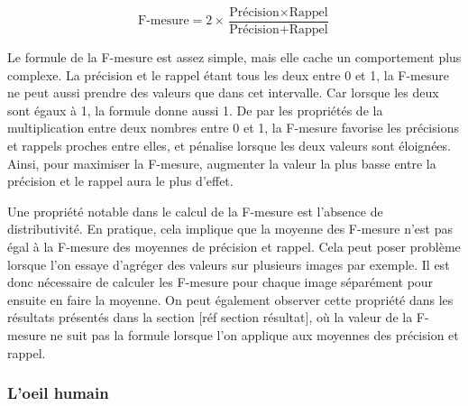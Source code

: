 	\begin{equation}
		\text{F-mesure} = 2 \times \frac{\text{Précision} \times \text{Rappel}}{\text{Précision}+\text{Rappel}}
	\end{equation}

	Le formule de la F-mesure est assez simple, mais elle cache un comportement plus complexe. La précision et le rappel étant tous les deux entre 0 et 1, la F-mesure ne peut aussi prendre des valeurs que dans cet intervalle. Car lorsque les deux sont égaux à 1, la formule donne aussi 1. De par les propriétés de la multiplication entre deux nombres entre 0 et 1, la F-mesure favorise les précisions et rappels proches entre elles, et pénalise lorsque les deux valeurs sont éloignées. Ainsi, pour maximiser la F-mesure, augmenter la valeur la plus basse entre la précision et le rappel aura le plus d'effet.
	
	Une propriété notable dans le calcul de la F-mesure est l'absence de distributivité. En pratique, cela implique que la moyenne des F-mesure n'est pas égal à la F-mesure des moyennes de précision et rappel. Cela peut poser problème lorsque l'on essaye d'agréger des valeurs sur plusieurs images par exemple. Il est donc nécessaire de calculer les F-mesure pour chaque image séparément pour ensuite en faire la moyenne. On peut également observer cette propriété dans les résultats présentés dans la section [réf section résultat], où la valeur de la F-mesure ne suit pas la formule lorsque l'on applique aux moyennes des précision et rappel.

	\subsubsection{L'oeil humain}

